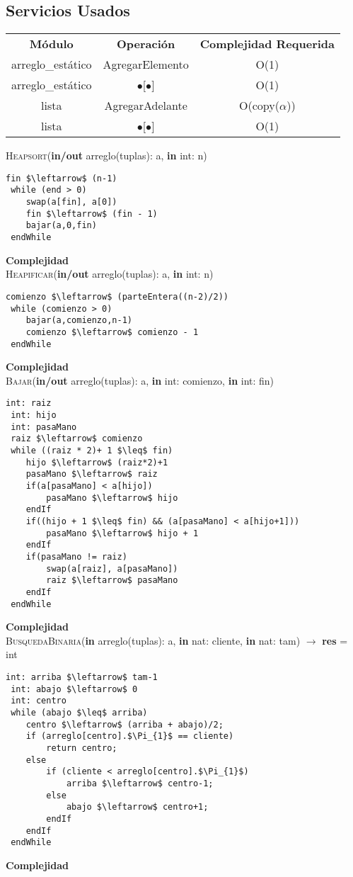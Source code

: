 \subsection{Servicios Usados}
\begin{center}
\begin{tabular*}{2.75\textwidth}{c |c | c }
\textbf{M\'odulo} & \textbf{Operaci\'on} & \textbf{Complejidad Requerida}\\
arreglo\_est\'atico & AgregarElemento & O(1)\\
arreglo\_est\'atico & $\bullet$[$\bullet$] & O(1)\\
lista & AgregarAdelante & O(copy($\alpha$))\\
lista & $\bullet$[$\bullet$] & O(1)\\
\end{tabular*}
\end{center}

\textsc{Heapsort}(\textbf{in/out} arreglo(tuplas): a, \textbf{in} int: n)
\begin{lstlisting}[mathescape]
 fin $\leftarrow$ (n-1)
 while (end > 0)
 	swap(a[fin], a[0])
 	fin $\leftarrow$ (fin - 1)
 	bajar(a,0,fin)
 endWhile
\end{lstlisting}
\textbf{Complejidad}\\


\textsc{Heapificar}(\textbf{in/out} arreglo(tuplas): a, \textbf{in} int: n)
\begin{lstlisting}[mathescape]
 comienzo $\leftarrow$ (parteEntera((n-2)/2))
 while (comienzo > 0)
 	bajar(a,comienzo,n-1)
 	comienzo $\leftarrow$ comienzo - 1
 endWhile
\end{lstlisting}
\textbf{Complejidad}\\

\textsc{Bajar}(\textbf{in/out} arreglo(tuplas): a, \textbf{in} int: comienzo, \textbf{in} int: fin)
\begin{lstlisting}[mathescape]
 int: raiz
 int: hijo
 int: pasaMano
 raiz $\leftarrow$ comienzo
 while ((raiz * 2)+ 1 $\leq$ fin)
 	hijo $\leftarrow$ (raiz*2)+1
 	pasaMano $\leftarrow$ raiz
 	if(a[pasaMano] < a[hijo])
 		pasaMano $\leftarrow$ hijo
 	endIf
 	if((hijo + 1 $\leq$ fin) && (a[pasaMano] < a[hijo+1]))
 		pasaMano $\leftarrow$ hijo + 1
 	endIf
 	if(pasaMano != raiz)
 		swap(a[raiz], a[pasaMano])
 		raiz $\leftarrow$ pasaMano
 	endIf
 endWhile
\end{lstlisting}
\textbf{Complejidad}\\


\textsc{BusquedaBinaria}(\textbf{in} arreglo(tuplas): a, \textbf{in} nat: cliente, \textbf{in} nat: tam) $\rightarrow$ \textbf{res} = int
\begin{lstlisting}[mathescape]
 int: arriba $\leftarrow$ tam-1
 int: abajo $\leftarrow$ 0
 int: centro
 while (abajo $\leq$ arriba)
 	centro $\leftarrow$ (arriba + abajo)/2;
    if (arreglo[centro].$\Pi_{1}$ == cliente)
 		return centro;
    else
 		if (cliente < arreglo[centro].$\Pi_{1}$)
   			arriba $\leftarrow$ centro-1;
 		else
   			abajo $\leftarrow$ centro+1;
   		endIf
   	endIf
 endWhile
\end{lstlisting}
\textbf{Complejidad}\\
